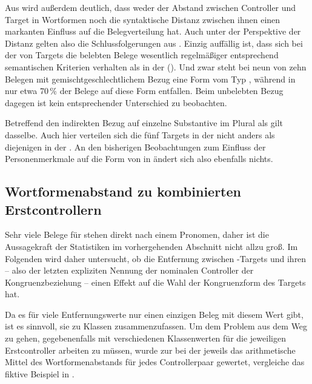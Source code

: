 Aus  wird außerdem deutlich, dass weder der Abstand
zwischen Controller und Target in Wortformen noch die
syntaktische Distanz zwischen ihnen einen markanten
Einfluss auf die Belegverteilung hat. Auch unter
der Perspektive der Distanz gelten also die Schlussfolgerungen aus
. Einzig auffällig ist, dass sich bei der
 von Targets die belebten Belege wesentlich
regelmäßiger entsprechend semantischen Kriterien verhalten als in der
 (). Und zwar steht bei neun von zehn
Belegen mit gemischtgeschlechtlichem Bezug eine Form vom Typ ,
während in  nur etwa 70\,\% der Belege auf diese Form
entfallen. Beim unbelebten Bezug dagegen ist kein entsprechender
Unterschied zu beobachten.

Betreffend den indirekten Bezug auf einzelne Substantive im Plural als
 gilt dasselbe. Auch hier verteilen sich die fünf Targets
in der   nicht anders als diejenigen in der
 . An den bisherigen Beobachtungen zum
Einfluss der Personenmerkmale auf die Form von  in
 ändert sich also ebenfalls nichts.


\subsection{Wortformenabstand zu kombinierten Erstcontrollern}

Sehr viele Belege für  stehen direkt nach einem Pronomen, daher ist
die Aussagekraft der Statistiken im vorhergehenden Abschnitt nicht allzu groß.
Im Folgenden wird daher untersucht, ob die Entfernung zwischen
-Targets und ihren  -- also der letzten
expliziten Nennung der nominalen Controller der
Kongruenzbeziehung -- einen Effekt auf die Wahl der
Kongruenzform des Targets hat.

Da es für viele Entfernungswerte nur einen einzigen Beleg mit diesem Wert gibt,
ist es sinnvoll, sie zu Klassen zusammenzufassen. Um dem Problem aus dem Weg zu
gehen, gegebenenfalls mit verschiedenen Klassenwerten für die jeweiligen
Erstcontroller arbeiten zu müssen, wurde zur  bei
der  jeweils das arithmetische Mittel des
Wortformenabstands für jedes Controllerpaar gewertet, vergleiche das fiktive
Beispiel in .


